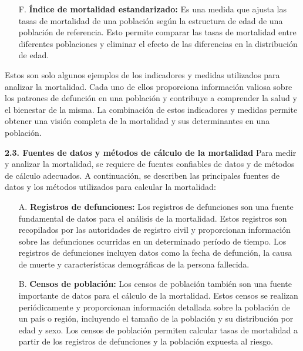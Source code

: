 \documentclass[8pt,a4paper]{beamer}
\begin{document}
{\begin{frame}{}
\begin{block}{}
\begin{enumerate}
\item[F.] \textbf{Índice de mortalidad estandarizado:} Es una medida que ajusta las tasas de mortalidad de una población según la estructura de edad de una población de referencia. Esto permite comparar las tasas de mortalidad entre diferentes poblaciones y eliminar el efecto de las diferencias en la distribución de edad.
\end{enumerate}
Estos son solo algunos ejemplos de los indicadores y medidas utilizados para analizar la mortalidad. Cada uno de ellos proporciona información valiosa sobre los patrones de defunción en una población y contribuye a comprender la salud y el bienestar de la misma. La combinación de estos indicadores y medidas permite obtener una visión completa de la mortalidad y sus determinantes en una población.
\end{block}
\end{frame}

\begin{frame}{}
\begin{block}{\textbf{2.3. Fuentes de datos y métodos de cálculo de la mortalidad}}
\setlength{\parskip}{3px}
\justifying
Para medir y analizar la mortalidad, se requiere de fuentes confiables de datos y de métodos de cálculo adecuados. A continuación, se describen las principales fuentes de datos y los métodos utilizados para calcular la mortalidad:
\begin{enumerate}
\setlength{\parskip}{3px}
\justifying
\item[A.] \textbf{Registros de defunciones:} Los registros de defunciones son una fuente fundamental de datos para el análisis de la mortalidad. Estos registros son recopilados por las autoridades de registro civil y proporcionan información sobre las defunciones ocurridas en un determinado período de tiempo. Los registros de defunciones incluyen datos como la fecha de defunción, la causa de muerte y características demográficas de la persona fallecida.

\item[B.] \textbf{Censos de población:} Los censos de población también son una fuente importante de datos para el cálculo de la mortalidad. Estos censos se realizan periódicamente y proporcionan información detallada sobre la población de un país o región, incluyendo el tamaño de la población y su distribución por edad y sexo. Los censos de población permiten calcular tasas de mortalidad a partir de los registros de defunciones y la población expuesta al riesgo.

\end{enumerate}
\end{block}
\end{frame}

}
\end{document}
